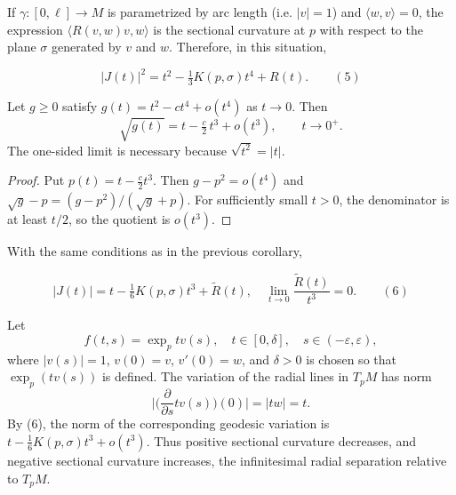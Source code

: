 \begin{corollary}
  \label{cor:dc-ch5-2-9}


  If $\gamma:[0,\ell]\to M$ is parametrized by arc length (i.e. $|v|=1$) and
  $\langle w,v\rangle=0$, the expression $\langle R(v,w)v,w\rangle$ is the sectional
  curvature at $p$ with respect to the plane $\sigma$ generated by $v$ and $w$.
  Therefore, in this situation,

  $$
  |J(t)|^2=t^2-\tfrac{1}{3}K(p,\sigma)t^4+R(t).\qquad(5)
  $$

\end{corollary}

\begin{lemma}
  \label{lem:dc-ch5-2-10-sqrt}


  Let $g\ge0$ satisfy $g(t)=t^2-ct^4+o(t^4)$ as $t\to0$. Then
  $$
  \sqrt{g(t)}=t-\tfrac{c}{2}\,t^3+o(t^3),\qquad t\to 0^+.
  $$
  The one-sided limit is necessary because $\sqrt{t^2}=|t|$.
\end{lemma}
\begin{proof}

  \sketch
  Put $p(t)=t-\tfrac c2t^3$. Then $g-p^2=o(t^4)$ and
  $\sqrt g-p=(g-p^2)/(\sqrt g+p)$. For sufficiently small $t>0$, the denominator
  is at least $t/2$, so the quotient is $o(t^3)$.
\end{proof}

\begin{corollary}
  \label{cor:dc-ch5-2-10}


  With the same conditions as in the previous corollary,

  $$
  |J(t)|=t-\tfrac{1}{6}K(p,\sigma)t^3+\tilde R(t),\quad\lim_{t\to 0}\frac{\tilde R(t)}{t^3}=0.\qquad(6)
  $$

\end{corollary}

\begin{remark}
  \label{rem:dc-ch5-2-11}
  Let
  $$
  f(t,s)=\exp_p tv(s),\quad t\in[0,\delta],\quad s\in(-\varepsilon,\varepsilon),
  $$
  where $|v(s)|=1$, $v(0)=v$, $v'(0)=w$, and $\delta>0$ is chosen so that
  $\exp_p(tv(s))$ is defined. The variation of the radial lines in $T_pM$ has
  norm
  $$
  \Big|\Big(\frac{\partial}{\partial s}tv(s)\Big)(0)\Big|=|tw|=t.
  $$
  By (6), the norm of the corresponding geodesic variation is
  $t-\frac16K(p,\sigma)t^3+o(t^3)$. Thus positive sectional curvature decreases,
  and negative sectional curvature increases, the infinitesimal radial
  separation relative to $T_pM$.
\end{remark}

